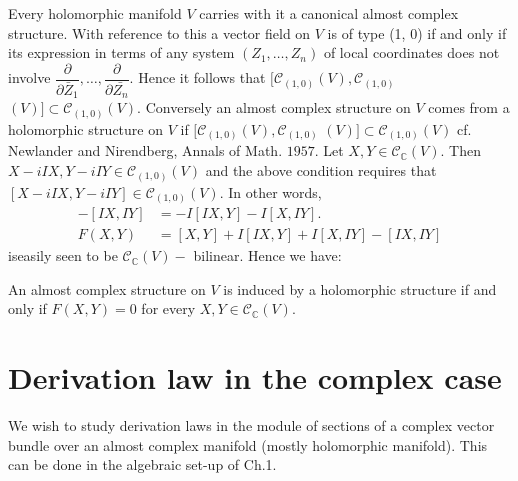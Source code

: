Every holomorphic manifold $V$ carries with it a canonical almost
complex structure. With reference to this a vector field on $V$ is of
type (1, 0) if and only if its expression in terms of any system
$(Z_1, \ldots, Z_n)$ of local coordinates does not involve
$\dfrac{\partial}{\partial \bar{Z}_1}, \ldots,
\dfrac{\partial}{\partial \bar{Z_n}}$. Hence it follows that $[
  \mathscr{C}_{(1, 0)}(V), \mathscr{C}_{(1, 0)}$ $(V) ] \subset
\mathscr{C}_{(1, 0)} (V)$. Conversely an almost complex structure on
$V$ comes from a holomorphic structure on $V$ if $[ \mathscr{C}_{(1,
    0)}(V), \mathscr{C}_{(1, 0)}$ $(V) ] \subset \mathscr{C}_{(1, 0)}
(V)$ cf. Newlander and Nirendberg, Annals of Math. $1957$. Let $X, Y
\in \mathscr{C}_\mathbb{C}(V)$. Then $X - iIX, Y - iIY \in
\mathscr{C}_{(1, 0)} (V)$ and the above condition requires that $[X -
  iIX, Y - iIY] \in \mathscr{C}_{(1, 0)} (V)$. In other words, 
\begin{align*}
  [X,Y] - [IX, IY] & = -  I [IX, Y] -  I [X, IY].\\
  F(X, Y) & = [X, Y] + I [IX, Y] + I [X, IY] - [IX, IY]
\end{align*}
is\pageoriginale easily seen to be $\mathscr{C}_{\mathbb{C}} (V)-$ bilinear. Hence
we have: 

An almost complex structure on $V$ is induced by a holomorphic
structure if and only if $F(X, Y) = 0$ for every $X, Y \in
\mathscr{C}_{\mathbb{C}} (V)$. 

\section{Derivation law in the complex case}\label{chap6:sec3}%

We wish to study derivation laws in the module of sections of a
complex vector bundle over an almost complex manifold (mostly
holomorphic manifold). This can be done in the algebraic set-up of
Ch.1. 

